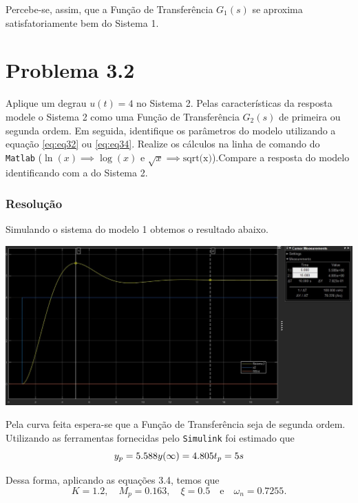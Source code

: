 \documentclass[
]{book}
\theoremstyle{definition}
\theoremstyle{definition}
\theoremstyle{definition}
\theoremstyle{remark}
\begin{document}
Percebe-se, assim, que a Função de Transferência \(G_1(s)\) se aproxima satisfatoriamente bem do Sistema 1.

\hypertarget{problema-3.2}{%
\section*{Problema 3.2}\label{problema-3.2}}

Aplique um degrau \(u(t) = 4\) no Sistema 2. Pelas características da resposta modele o Sistema 2 como uma Função de Transferência \(G_2(s)\) de primeira ou segunda ordem. Em seguida, identifique os parâmetros do modelo utilizando a equação \eqref{eq:eq32} ou \eqref{eq:eq34}. Realize os cálculos na linha de comando do \texttt{Matlab} (\(\ln{(x)} \implies \log{(x)}\) e \(\sqrt{x} \implies \text{sqrt(x)}\)).Compare a resposta do modelo identificando com a do Sistema 2.

\hypertarget{resoluuxe7uxe3o-7}{%
\subsubsection*{Resolução}\label{resoluuxe7uxe3o-7}}

Simulando o sistema do modelo 1 obtemos o resultado abaixo.

\includegraphics{Imagens/Lab3/Resolução/prob2A.jpg}

Pela curva feita espera-se que a Função de Transferência seja de segunda ordem. Utilizando as ferramentas fornecidas pelo \texttt{Simulink} foi estimado que
\[
y_p = 5.588 \\  
y(\infty) = 4.805 \\  
t_p = 5s
\]

Dessa forma, aplicando as equações 3.4, temos que
\[
K = 1.2, \quad M_p = 0.163, \quad \xi = 0.5 \quad \text{e} \quad \omega_n = 0.7255.
\]
\end{document}
